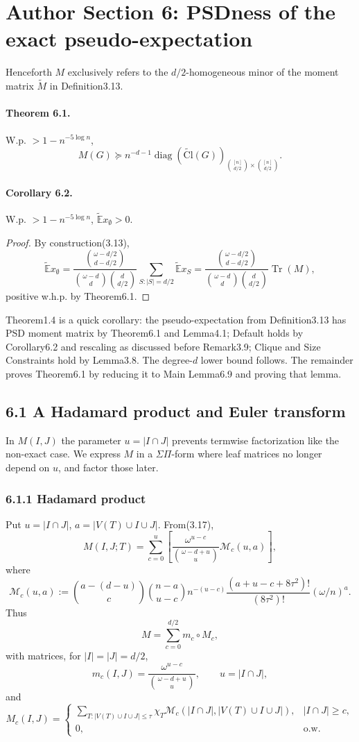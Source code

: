 \section*{Author Section 6: PSDness of the exact pseudo-expectation}
Henceforth $M$ exclusively refers to the $d/2$-homogeneous minor of the moment matrix $\widetilde M$ in Definition3.13.
\paragraph{Theorem 6.1.} W.p. $>1-n^{-5\log n}$,
\[M(G)\succeq n^{-d-1}\operatorname{diag}(\widetilde{\mathrm{Cl}}(G))_{\binom{[n]}{d/2}\times\binom{[n]}{d/2}}.\]
\paragraph{Corollary 6.2.} W.p. $>1-n^{-5\log n}$, $\widetilde{\mathbb E}x_\emptyset>0$.
\begin{proof}By construction(3.13),
\[\widetilde{\mathbb E}x_\emptyset=\frac{\binom{\omega-d/2}{d-d/2}}{\binom{\omega-d}d\binom d{d/2}}\sum_{S:|S|=d/2}\widetilde{\mathbb E}x_S=\frac{\binom{\omega-d/2}{d-d/2}}{\binom{\omega-d}d\binom d{d/2}}\operatorname{Tr}(M),\]
positive w.h.p. by Theorem6.1.\end{proof}
Theorem1.4 is a quick corollary: the pseudo-expectation from Definition3.13 has PSD moment matrix by Theorem6.1 and Lemma4.1; Default holds by Corollary6.2 and rescaling as discussed before Remark3.9; Clique and Size Constraints hold by Lemma3.8. The degree-$d$ lower bound follows. The remainder proves Theorem6.1 by reducing it to Main Lemma6.9 and proving that lemma.
\subsection*{6.1 A Hadamard product and Euler transform}
In $M(I,J)$ the parameter $u=|I\cap J|$ prevents termwise factorization like the non-exact case. We express $M$ in a $\Sigma\Pi$-form where leaf matrices no longer depend on $u$, and factor those later.
\subsubsection*{6.1.1 Hadamard product}
Put $u=|I\cap J|$, $a=|V(T)\cup I\cup J|$. From(3.17),
\[M(I,J;T)=\sum_{c=0}^u\left[\frac{\omega^{u-c}}{\binom{\omega-d+u}u}\mathcal M_c(u,a)\right],\tag{6.1}\]
where
\[\mathcal M_c(u,a):=\binom{a-(d-u)}c\binom{n-a}{u-c}n^{-(u-c)}\frac{(a+u-c+8\tau^2)!}{(8\tau^2)!}(\omega/n)^a.\]
Thus
\[M=\sum_{c=0}^{d/2}m_c\circ M_c,\tag{6.2}\]
with matrices, for $|I|=|J|=d/2$,
\[m_c(I,J)=\frac{\omega^{u-c}}{\binom{\omega-d+u}u},\qquad u=|I\cap J|,\tag{6.3}\]
and
\[M_c(I,J)=\begin{cases}\sum_{T:|V(T)\cup I\cup J|\le\tau}\chi_T\mathcal M_c(|I\cap J|,|V(T)\cup I\cup J|),&|I\cap J|\ge c,\\0,&\text{o.w.}\end{cases}\tag{6.4}\]
